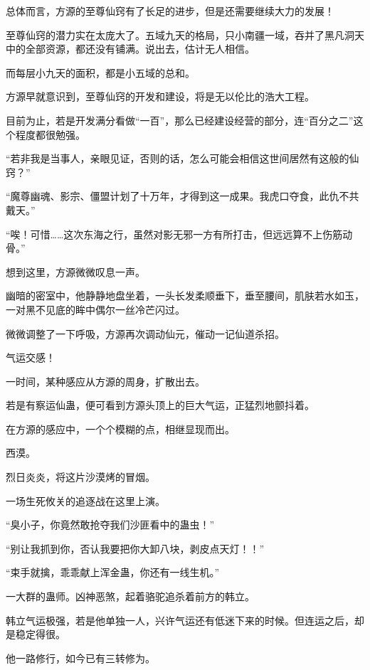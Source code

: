 
\begin{this_body}

总体而言，方源的至尊仙窍有了长足的进步，但是还需要继续大力的发展！

至尊仙窍的潜力实在太庞大了。五域九天的格局，只小南疆一域，吞并了黑凡洞天中的全部资源，都还没有铺满。说出去，估计无人相信。

而每层小九天的面积，都是小五域的总和。

方源早就意识到，至尊仙窍的开发和建设，将是无以伦比的浩大工程。

目前为止，若是开发满分看做“一百”，那么已经建设经营的部分，连“百分之二”这个程度都很勉强。

“若非我是当事人，亲眼见证，否则的话，怎么可能会相信这世间居然有这般的仙窍？”

“魔尊幽魂、影宗、僵盟计划了十万年，才得到这一成果。我虎口夺食，此仇不共戴天。”

“唉！可惜……这次东海之行，虽然对影无邪一方有所打击，但远远算不上伤筋动骨。”

想到这里，方源微微叹息一声。

幽暗的密室中，他静静地盘坐着，一头长发柔顺垂下，垂至腰间，肌肤若水如玉，一对黑不见底的眸中偶尔一丝冷芒闪过。

微微调整了一下呼吸，方源再次调动仙元，催动一记仙道杀招。

气运交感！

一时间，某种感应从方源的周身，扩散出去。

若是有察运仙蛊，便可看到方源头顶上的巨大气运，正猛烈地颤抖着。

在方源的感应中，一个个模糊的点，相继显现而出。

西漠。

烈日炎炎，将这片沙漠烤的冒烟。

一场生死攸关的追逐战在这里上演。

“臭小子，你竟然敢抢夺我们沙匪看中的蛊虫！”

“别让我抓到你，否认我要把你大卸八块，剥皮点天灯！！”

“束手就擒，乖乖献上浑金蛊，你还有一线生机。”

一大群的蛊师。凶神恶煞，起着骆驼追杀着前方的韩立。

韩立气运极强，若是他单独一人，兴许气运还有低迷下来的时候。但连运之后，却是稳定得很。

他一路修行，如今已有三转修为。


\end{this_body}
